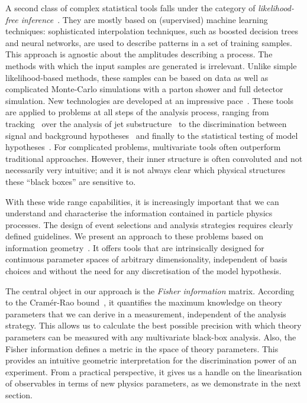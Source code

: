 A second class of complex statistical tools falls under the category of
\emph{likelihood-free inference}~\cite{cranmer:nips2016}. They are
mostly based on (supervised) machine learning techniques:
sophisticated interpolation techniques, such as boosted decision trees
and neural networks, are used to describe patterns in a set of
training samples. This approach is agnostic about the amplitudes
describing a process. The methods with which the input samples are
generated is irrelevant. Unlike simple likelihood-based methods, these
samples can be based on data as well as complicated Monte-Carlo
simulations with a parton shower and full detector simulation. New
technologies are developed at an impressive
pace~\cite{Cranmer:2015bka, Louppe:2016ylz, Louppe:2016aov,
  Cranmer:2016lzt, Baldi:2016fzo}. These tools are applied to problems
at all steps of the analysis process, ranging from
tracking~\cite{Brehmer:ghost_probability} over the analysis of jet
substructure~\cite{Cogan:2014oua, Baldi:2014pta, deOliveira:2015xxd,
  Almeida:2015jua, Baldi:2016fql, Guest:2016iqz, Komiske:2016rsd,
  Kasieczka:2017nvn, Louppe:2017ipp} to the discrimination between
signal and background hypotheses~\cite{Baldi:2014kfa, Searcy:2015apa,
  Santos:2016kno, Alves:2016htj} and finally to the statistical
testing of model hypotheses~\cite{Buckley:2011kc, Bornhauser:2013aya,
  Bechtle:2017vyu}. For complicated problems, multivariate tools often
outperform traditional approaches. However, their inner structure is
often convoluted and not necessarily very intuitive; and it is not
always clear which physical structures these ``black boxes'' are
sensitive to.

\newparagraph
%
With these wide range capabilities, it is increasingly important that
we can understand and characterise the information contained in
particle physics processes. The design of event selections and
analysis strategies requires clearly defined guidelines. We present an
approach to these problems based on information
geometry~\cite{efron1975, amari1982, amari2000joho}. It offers tools that are
intrinsically designed for continuous parameter spaces of arbitrary
dimensionality, independent of basis choices and without the need for
any discretisation of the model hypothesis.

The central object in our approach is the \emph{Fisher information}
matrix. According to the Cram\'er-Rao bound~\cite{Rao:1945,
  Cramer:1946}, it quantifies the maximum knowledge on
theory parameters that we can derive in a measurement, independent of
the analysis strategy. This allows us to calculate the best possible
precision with which theory parameters can be measured with any
multivariate black-box analysis. Also, the Fisher information defines
a metric in the space of theory parameters. This provides an intuitive
geometric interpretation for the discrimination power of an
experiment. From a practical perspective, it gives us a handle on the
linearisation of observables in terms of new physics parameters, as we
demonstrate in the next section.

